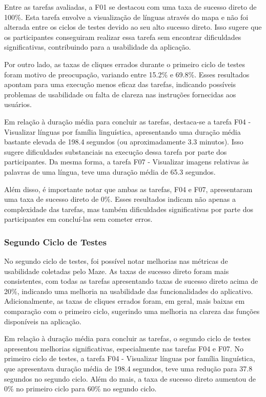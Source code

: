 Entre as tarefas avaliadas, a F01 se destacou com uma taxa de sucesso direto de 100\%. Esta tarefa envolve a visualização de línguas através do mapa e não foi alterada entre os ciclos de testes devido ao seu alto sucesso direto. Isso sugere que os participantes conseguiram realizar essa 
tarefa sem encontrar dificuldades significativas, contribuindo para a usabilidade da aplicação.

Por outro lado, as taxas de cliques errados durante o primeiro ciclo de testes foram motivo de preocupação, variando entre 15.2\% e 69.8\%. Esses resultados apontam para uma execução menos eficaz das tarefas, indicando possíveis problemas de usabilidade ou falta de clareza nas instruções 
fornecidas aos usuários.

Em relação à duração média para concluir as tarefas, destaca-se a tarefa F04 - Visualizar línguas por família linguística, apresentando uma duração média bastante elevada de 198.4 segundos (ou aproximadamente 3.3 minutos). Isso sugere dificuldades substanciais na execução 
dessa tarefa por parte dos participantes. Da mesma forma, a tarefa F07 - Visualizar imagens relativas às palavras de uma língua, teve uma duração média de 65.3 segundos.

Além disso, é importante notar que ambas as tarefas, F04 e F07, apresentaram uma taxa de sucesso direto de 0\%. Esses resultados indicam não apenas a complexidade das tarefas, mas também dificuldades significativas por parte dos participantes em concluí-las sem cometer erros. 

\subsubsection{Segundo Ciclo de Testes}
\label{sec:Segundo Ciclo de Testes}
No segundo ciclo de testes, foi possível notar melhorias nas métricas de usabilidade coletadas pelo Maze. As taxas de sucesso direto foram mais consistentes, com todas as tarefas apresentando taxas de sucesso direto acima de 20\%, indicando uma melhoria na usabilidade das 
funcionalidades do aplicativo. Adicionalmente, as taxas de cliques errados foram, em geral, mais baixas em comparação com o primeiro ciclo, sugerindo uma melhoria na clareza das funções disponíveis na aplicação.

Em relação à duração média para concluir as tarefas, o segundo ciclo de testes apresentou melhorias significativas, especialmente nas tarefas F04 e F07. No primeiro ciclo de testes, a tarefa F04 - Visualizar línguas por família linguística, que apresentava duração média de 
198.4 segundos, teve uma redução para 37.8 segundos no segundo ciclo. Além do mais, a taxa de sucesso direto aumentou de 0\% no primeiro ciclo para 60\% no segundo ciclo.

